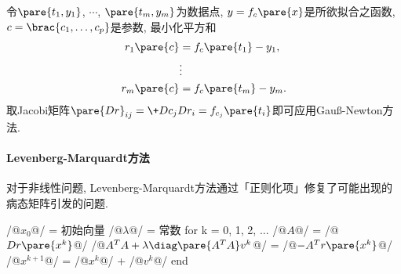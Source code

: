 \documentclass{ctexart}
\begin{document}
令$\pare{t_1,y_1}$, $\cdots$, $\pare{t_m,y_m}$为数据点, $y = f_c\pare{x}$是所欲拟合之函数, $c = \brac{c_1,\dots,c_p}$是参数, 最小化平方和
\begin{align*}
    r_1\pare{c} &= f_c\pare{t_1} - y_1, \\
    & \vdots \\
    r_m\pare{c} &= f_c\pare{t_m} - y_m.
\end{align*}
取Jacobi矩阵$\pare{Dr}_{ij} = \displaystyle \+D{c_j}D{r_i} = f_{c_j}\pare{t_i}$即可应用Gau\ss-Newton方法.


\paragraph{Levenberg-Marquardt方法} %
\label{par:levenberg_marquardt方法}

对于非线性问题, Levenberg-Marquardt方法通过「正则化项」修复了可能出现的病态矩阵引发的问题.
\begin{matlablst}
/@$x_0$@/ = 初始向量
/@$\lambda$@/ = 常数
for k = 0, 1, 2, ...
    /@$A$@/ = /@$Dr\pare{x^k}$@/
    /@$A^T A + \lambda \diag\pare{A^TA}v^k$@/ = /@$-A^Tr\pare{x^k}$@/
    /@$x^{k+1}$@/ = /@$x^k$@/ + /@$v^k$@/
end
\end{matlablst}




\end{document}
